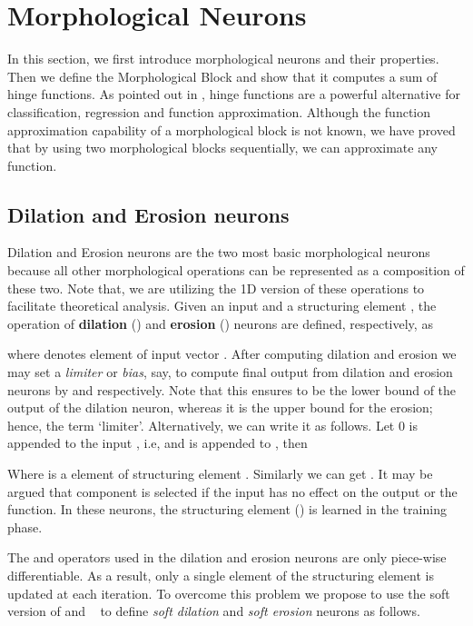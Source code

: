 \documentclass{bmvc2k}
\newcommand{\newterm}[1]{{\bf #1}}
\begin{document}
\section{Morphological Neurons}
\label{sec:morph_net}


In this section, we first introduce morphological neurons and their properties. Then we define the Morphological Block and show that it computes a sum of hinge functions. As pointed out in \cite{breiman1993hinging}, hinge functions are a powerful alternative for classification, regression and function approximation. Although the function approximation capability of a morphological block is not known, we have proved that by using two morphological blocks sequentially, we can approximate any function.

\subsection{Dilation and Erosion neurons}
\label{sec:de_neurons} 
Dilation and Erosion neurons are the two most basic morphological neurons because all other morphological operations can be represented as a composition of these two. Note that, we are utilizing the 1D version of these operations to facilitate theoretical analysis.
Given an input  and a structuring element , the operation of \newterm{dilation} () and \newterm{erosion} () neurons are defined, respectively, as 

where   denotes  element of  input vector . After computing dilation and erosion we may set a \textit{limiter} or \textit{bias}, say,  to compute final output from dilation and erosion neurons by  and  respectively. Note that this ensures  to be the lower bound of the output of the dilation neuron, whereas it is the upper bound for the erosion; hence, the term `limiter'. 
Alternatively, we can write it as follows. Let 0 is appended to the input , i.e,  and   is appended to , then

Where  is a element of structuring element  . Similarly we can get . It may be argued that  component is selected if the input has no effect on the output or the function. 
In these neurons, the structuring element () is learned in the training phase.

The  and  operators used in the dilation and erosion neurons are only piece-wise differentiable. As a result, only a single element of the structuring element is updated at each iteration. To overcome this problem we propose to use the soft version of  and ~\cite{cook2011basic} to define \emph{soft dilation} and \emph{soft erosion} neurons as follows.
\end{document}
